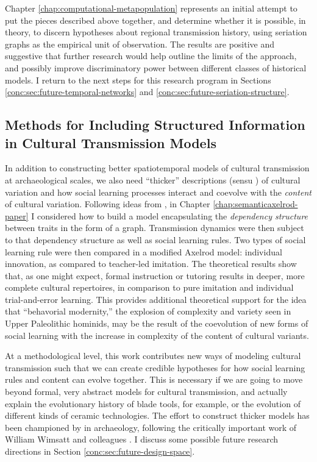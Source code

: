 Chapter \ref{chap:computational-metapopulation} represents an initial attempt to put the pieces described above together, and determine whether it is possible, in theory, to discern hypotheses about regional transmission history, using seriation graphs as the empirical unit of observation.  The results are positive and suggestive that further research would help outline the limits of the approach, and possibly improve discriminatory power between different classes of historical models.  I return to the next steps for this research program in Sections \ref{conc:sec:future-temporal-networks} and \ref{conc:sec:future-seriation-structure}.   

\subsection{Methods for Including Structured Information in Cultural Transmission Models}\label{conc:sec:conc-structured}

In addition to constructing better spatiotemporal models of cultural transmission at archaeological scales, we also need ``thicker'' descriptions (sensu \citealt{Geertz1973,gilbert1949concept}) of cultural variation and how social learning processes interact and coevolve with the \emph{content} of cultural variation.  Following ideas from \citet{mesoudi2008learning}, in Chapter \ref{chap:semanticaxelrod-paper} I considered how to build a model encapsulating the \emph{dependency structure} between traits in the form of a graph.  Transmission dynamics were then subject to that dependency structure as well as social learning rules.  Two types of social learning rule were then compared in a modified Axelrod model:  individual innovation, as compared to teacher-led imitation.  The theoretical results show that, as one might expect, formal instruction or tutoring results in deeper, more complete cultural repertoires, in comparison to pure imitation and individual trial-and-error learning.  This provides additional theoretical support for the idea that ``behavorial modernity,'' the explosion of complexity and variety seen in Upper Paleolithic hominids, may be the result of the coevolution of new forms of social learning with the increase in complexity of the content of cultural variants.  

At a methodological level, this work contributes new ways of modeling cultural transmission such that we can create credible hypotheses for how social learning rules and content can evolve together.  This is necessary if we are going to move beyond formal, very abstract models for cultural transmission, and actually explain the evolutionary history of blade tools, for example, or the evolution of different kinds of ceramic technologies.  The effort to construct thicker models has been championed by \citet{tostevin2019content} in archaeology, following the critically important work of William Wimsatt and colleagues \citep{wimsatt2007reproducing,wimsatt2019articulating}.  I discuss some possible future research directions in Section \ref{conc:sec:future-design-space}.

